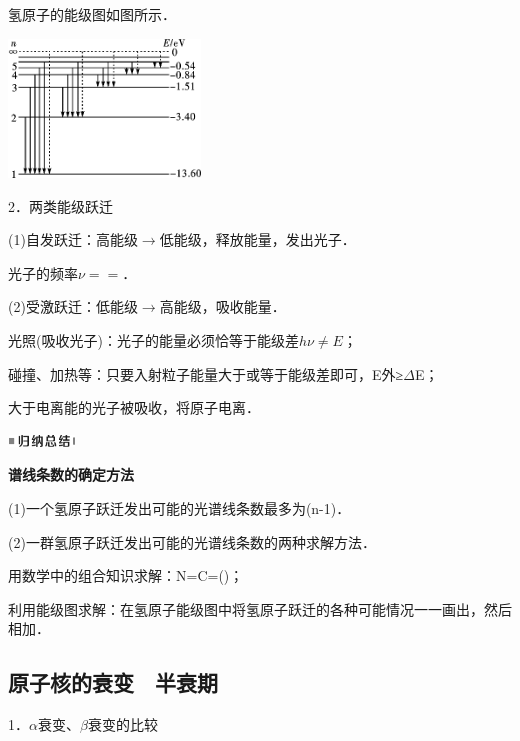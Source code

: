 氢原子的能级图如图所示．

\begin{center}\includegraphics[width=2.00972in,height=1.45278in]{media/image478.png}\end{center}

2．两类能级跃迁

(1)自发跃迁：高能级$\rightarrow$低能级，释放能量，发出光子．

光子的频率$\nu==$．

(2)受激跃迁：低能级$\rightarrow$高能级，吸收能量．

光照(吸收光子)：光子的能量必须恰等于能级差$h\nu\neq E$；

碰撞、加热等：只要入射粒子能量大于或等于能级差即可，E外≥$\Delta$E；

大于电离能的光子被吸收，将原子电离．

\begin{center}\includegraphics[width=0.70764in,height=0.12292in]{media/image13.png}\end{center}
\begin{center}
    \textbf{谱线条数的确定方法}
\end{center}

(1)一个氢原子跃迁发出可能的光谱线条数最多为(n-1)．

(2)一群氢原子跃迁发出可能的光谱线条数的两种求解方法．

用数学中的组合知识求解：N=C=()；

利用能级图求解：在氢原子能级图中将氢原子跃迁的各种可能情况一一画出，然后相加．
\newpage
\subsection{原子核的衰变　半衰期}

1．$\alpha$衰变、$\beta$衰变的比较

